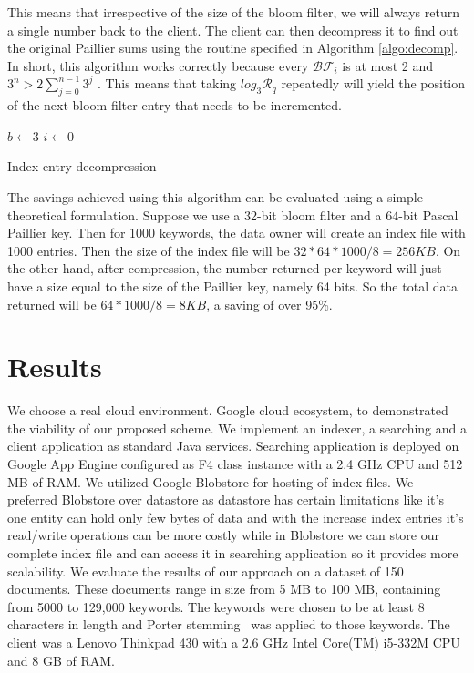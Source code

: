 This means that irrespective of the size
of the bloom filter,
we will always return a single number back to the client. The client can then
decompress it to find out the original Paillier sums using the routine
specified in Algorithm \ref{algo:decomp}. In short, this algorithm works correctly because every
$\mathcal{BF}_i$ is at most 2 and $ 3^{n} > 2\sum_{j=0}^{n-1} 3^{j}$ . This means
that taking $log_3 \mathcal{R}_q$ repeatedly will yield the position of the next
bloom filter entry that needs to be incremented.

\begin{algorithm}
$ b \gets 3 $ \;
$i \gets 0 $\;
\;
 \caption{Index entry decompression}
 \label{algo:decomp}
\end{algorithm}

The savings achieved using this algorithm can be evaluated using a simple theoretical
formulation. Suppose we use a 32-bit bloom filter and a $64$-bit Pascal Paillier key.
Then for 1000 keywords, the data owner will create an index file with 1000 entries.
Then the size of the index file will be $32*64*1000/8 = 256KB$. On the other hand,
after compression, the number returned per keyword will just have a size equal to the
size of the Paillier key, namely 64 bits. So the total data returned will be 
$64*1000/8 = 8KB$, a saving of over 95\%.


\section{Results}
\label{sec:eval}
We choose a real cloud environment. Google cloud ecosystem, to demonstrated the
viability of our proposed scheme. We implement an indexer, a searching and a
client application as standard Java services. Searching application is deployed
on Google App Engine configured as F4 class instance with a 2.4 GHz CPU and 512
MB of RAM. We utilized Google Blobstore for hosting of index files. We preferred
Blobstore over datastore as datastore has certain limitations like it’s one
entity can hold only few bytes of data and with the increase index entries it’s
read/write operations can be more costly while in Blobstore we can store our complete index file and can access it in searching application so it provides more scalability.
We evaluate the results of our approach on a dataset of 150 documents. 
These documents range in size from 5 MB to 100 MB, containing from 5000 to
129,000 keywords. The keywords were chosen to be at least 8 characters in
length and Porter stemming~\cite{porter} was applied to those keywords.
The client was a Lenovo Thinkpad 430 with a 2.6 GHz Intel Core(TM) i5-332M
CPU and 8 GB of RAM.

